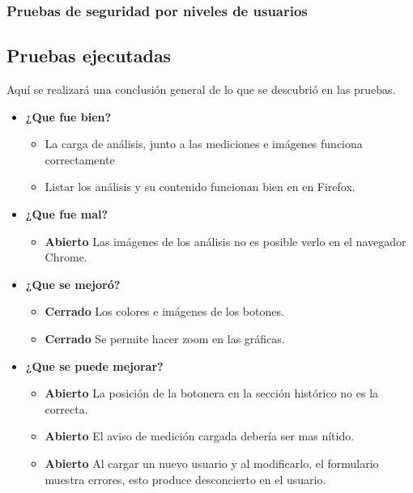 \documentclass[a4paper,12pt]{article}
\begin{document}
\subsubsection{ Pruebas de seguridad por niveles de usuarios}

\clearpage

\subsection{Pruebas ejecutadas}
Aquí se realizará una conclusión general de lo que se descubrió en las pruebas.
	\begin{itemize}
		\item \textbf{¿Que fue bien?}
        	\begin{itemize}
				\item       La carga de análisis, junto a las mediciones e imágenes funciona correctamente
				\item Listar los análisis y su contenido funcionan bien en en Firefox.
			\end{itemize}
		\item \textbf{¿Que fue mal?}
		\begin{itemize}
			\item \textbf{Abierto} Las imágenes de los análisis no es posible verlo en el navegador Chrome.
			
		\end{itemize}
   		\item \textbf{¿Que se mejoró?}
        	\begin{itemize}
                \item \textbf{Cerrado} Los colores e imágenes de los botones.
                \item \textbf{Cerrado} Se permite hacer zoom en las gráficas.
			\end{itemize}

   		\item \textbf{¿Que se puede mejorar?}
        	\begin{itemize}
		       \item \textbf{Abierto} La posición de la botonera en la sección histórico no es la correcta.
		       \item \textbf{Abierto}  El aviso de medición cargada debería ser mas nítido.
		       \item \textbf{Abierto} Al cargar un nuevo usuario y al modificarlo, el formulario muestra errores, esto produce desconcierto en el usuario.
            \end{itemize}
        

	\end{itemize}
\clearpage
\end{document}
